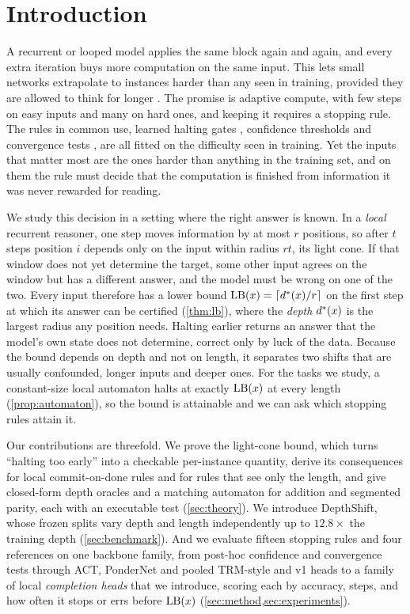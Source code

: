 \section{Introduction}
\label{sec:intro}

A recurrent or looped model applies the same block again and again, and every extra iteration buys more
computation on the same input. This lets small networks extrapolate to instances harder than any seen
in training, provided they are allowed to think for longer
\citep{schwarzschild2021thinking,bansal2022endtoend,geiping2025scaling,jolicoeur2025trm}. The promise is
adaptive compute, with few steps on easy inputs and many on hard ones, and keeping it requires a
stopping rule. The rules in common use, learned halting gates \citep{graves2016act,banino2021pondernet},
confidence thresholds and convergence tests \citep{zhou2020pabee,geiping2025scaling}, are all fitted on
the difficulty seen in training. Yet the inputs that matter most are the ones harder than anything in
the training set, and on them the rule must decide that the computation is finished from information it
was never rewarded for reading.

We study this decision in a setting where the right answer is known. In a \emph{local} recurrent
reasoner, one step moves information by at most $r$ positions, so after $t$ steps position $i$ depends
only on the input within radius $rt$, its light cone. If that window does not yet determine the target,
some other input agrees on the window but has a different answer, and the model must be wrong on one of
the two. Every input therefore has a lower bound $\operatorname{LB}(x)=\lceil d^{*}(x)/r\rceil$ on the first step at which
its answer can be certified (\cref{thm:lb}), where the \emph{depth} $d^{*}(x)$ is the largest radius any
position needs. Halting earlier returns an answer that the model's own state does not determine, correct
only by luck of the data. Because the bound depends on depth and not on length, it separates two shifts
that are usually confounded, longer inputs and deeper ones. For the tasks we study, a constant-size local
automaton halts at exactly $\operatorname{LB}(x)$ at every length (\cref{prop:automaton}), so the bound is attainable
and we can ask which stopping rules attain it.

Our contributions are threefold. We prove the light-cone bound, which turns ``halting too early'' into a
checkable per-instance quantity, derive its consequences for local commit-on-done rules and for rules
that see only the length, and give closed-form depth oracles and a matching automaton for addition and
segmented parity, each with an executable test (\cref{sec:theory}). We introduce DepthShift, whose
frozen splits vary depth and length independently up to $12.8\times$ the training depth
(\cref{sec:benchmark}). And we evaluate fifteen stopping rules and four references on one backbone family,
from post-hoc confidence and convergence tests through ACT, PonderNet and pooled TRM-style and v1 heads to
a family of local \emph{completion heads} that we introduce, scoring each by accuracy, steps, and how often
it stops or errs before $\operatorname{LB}(x)$ (\cref{sec:method,sec:experiments}).

